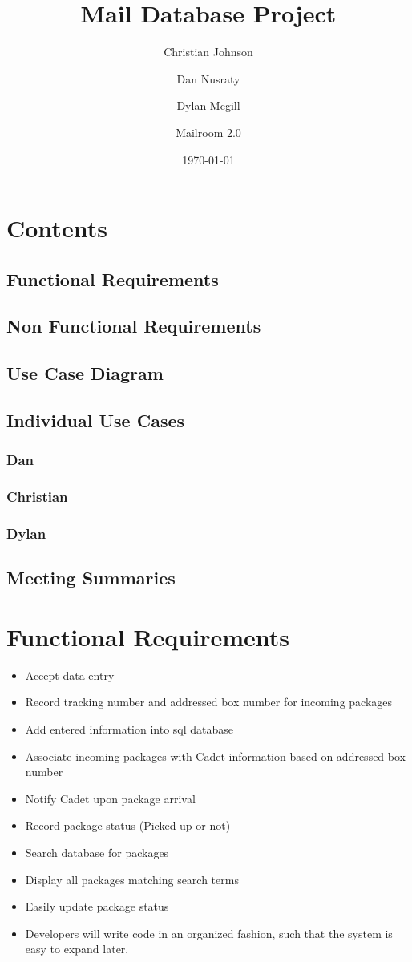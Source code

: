 \documentclass[11pt]{article}
\author{Christian Johnson\and Dan Nusraty\and Dylan Mcgill\and\newline Mailroom 2.0}
\date{\today}
\title{Mail Database Project}
\begin{document}
\maketitle
\section{Contents}
\label{sec:org76da9f8}
\subsection{Functional Requirements}
\label{sec:orge35fa85}
\subsection{Non Functional Requirements}
\label{sec:org7d1b51f}
\subsection{Use Case Diagram}
\label{sec:org989843c}
\subsection{Individual Use Cases}
\label{sec:org0a0813c}
\subsubsection{Dan}
\label{sec:org0785e5a}
\subsubsection{Christian}
\label{sec:orgb688143}
\subsubsection{Dylan}
\label{sec:org2bb8642}
\subsection{Meeting Summaries}
\label{sec:org930a0f0}
\clearpage
\section*{Functional Requirements}
\label{sec:org8fb7166}
\begin{itemize}
\item Accept data entry
\item Record tracking number and addressed box number for incoming packages
\item Add entered information into sql database
\item Associate incoming packages with Cadet information based on addressed box number
\item Notify Cadet upon package arrival
\item Record package status (Picked up or not)
\item Search database for packages
\item Display all packages matching search terms
\item Easily update package status
\item Developers will write code in an organized fashion, such that the system is easy to expand later.
\end{itemize}
\end{document}
